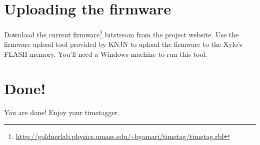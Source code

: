 \section{Uploading the firmware}
\label{Sec:UploadingFirmware}

Download the current
firmware\footnote{\url{http://goldnerlab.physics.umass.edu/~bgamari/timetag/timetag.rbf}}
bitstream from the project website. Use the firmware upload tool
provided by KNJN to upload the firmware to the Xylo's FLASH
memory. You'll need a Windows machine to run this tool.


\section{Done!}
You are done! Enjoy your timetagger.

\begin{comment}
\begin{figure}
  \center
  \texttt{[image: T.jpeg]}
  \caption{T the turtle says ``Hello!''.}
  \label{fig:T}
\end{figure}
\end{comment}

